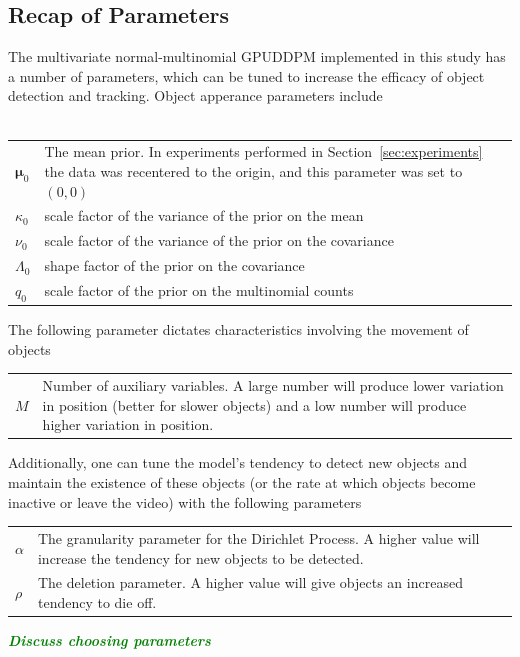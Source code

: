 \documentclass[smallcondensed, final]{svjour3}
\newcommand{\willie}[1]{\textcolor{green}{\textsf{\emph{\textbf{\textcolor{green}{#1}}}}}}
\begin{document}
\subsection{Recap of Parameters}
\label{sec:parameter_recap}

The multivariate normal-multinomial GPUDDPM implemented in this study has a number of parameters, which can be tuned to increase the efficacy of object detection and tracking. Object apperance parameters include\\\\
\begin{center}
\begin{tabular}[c]{l p{10cm}}
$\boldsymbol{\mu}_{0}$  &  The mean prior. In experiments performed in Section~\ref{sec:experiments} the data was recentered to the origin, and this parameter was set to $(0,0)$ \\
$\kappa_{0}$  &  scale factor of the variance of the prior on the mean\\
$\nu_{0}$  &  scale factor of the variance of the prior on the covariance\\
$\Lambda_{0}$  &  shape factor of the prior on the covariance\\
$q_{0}$  &  scale factor of the prior on the multinomial counts
\end{tabular}
\end{center} \vspace{5mm}
The following parameter dictates characteristics involving the movement of objects
\begin{center}
\begin{tabular}[c]{l p{10cm}}
$M$  &  Number of auxiliary variables. A large number will produce lower variation in position (better for slower objects) and a low number will produce higher variation in position.
\end{tabular}
\end{center} \vspace{5mm}
Additionally, one can tune the model's tendency to detect new objects and maintain the existence of these objects (or the rate at which objects become inactive or leave the video) with the following parameters
\begin{center}
\begin{tabular}[c]{l p{10cm}}
$\alpha$  &  The granularity parameter for the Dirichlet Process. A higher value will increase the tendency for new objects to be detected.\\
$\rho$  &  The deletion parameter. A higher value will give objects an increased tendency to die off.
\end{tabular}
\end{center}
\willie{Discuss choosing parameters}
\end{document}
